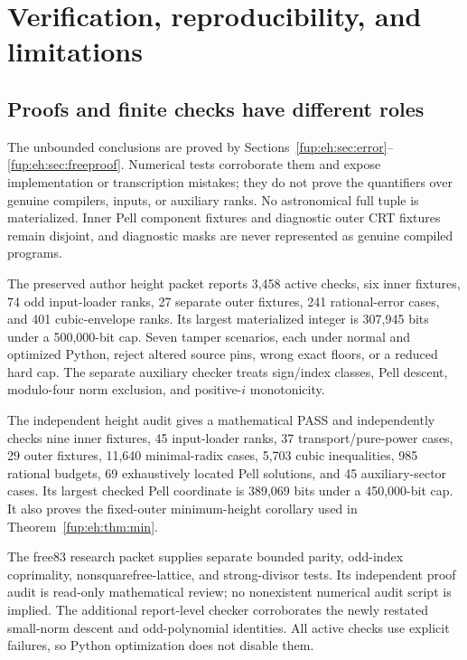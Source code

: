 \documentclass[11pt,letterpaper]{article}
\theoremstyle{definition}\newtheorem{definition}[theorem]{Definition}
\theoremstyle{remark}\newtheorem{remark}[theorem]{Remark}
\begin{document}
\section{Verification, reproducibility, and limitations}
\label{fup:eh:sec:verification}
\subsection{Proofs and finite checks have different roles}
The unbounded conclusions are proved by Sections~\ref{fup:eh:sec:error}--
\ref{fup:eh:sec:freeproof}. Numerical tests corroborate them and expose
implementation or transcription mistakes; they do not prove the
quantifiers over genuine compilers, inputs, or auxiliary ranks.
No astronomical full tuple is materialized. Inner Pell component
fixtures and diagnostic outer CRT fixtures remain disjoint, and
diagnostic masks are never represented as genuine compiled programs.

The preserved author height packet \cite{fup:eh:height} reports 3,458 active
checks, six inner fixtures, 74 odd input-loader ranks, 27 separate
outer fixtures, 241 rational-error cases, and 401 cubic-envelope ranks.
Its largest materialized integer is 307,945 bits under a 500,000-bit
cap. Seven tamper scenarios, each under normal and optimized Python,
reject altered source pins, wrong exact floors, or a reduced hard cap.
The separate auxiliary checker treats sign/index classes, Pell descent,
modulo-four norm exclusion, and positive-$i$ monotonicity.

The independent height audit \cite{fup:eh:heightaudit} gives a mathematical
PASS and independently checks nine inner fixtures, 45 input-loader
ranks, 37 transport/pure-power cases, 29 outer fixtures, 11,640
minimal-radix cases, 5,703 cubic inequalities, 985 rational budgets,
69 exhaustively located Pell solutions, and 45 auxiliary-sector cases.
Its largest checked Pell coordinate is 389,069 bits under a
450,000-bit cap. It also proves the fixed-outer minimum-height
corollary used in Theorem~\ref{fup:eh:thm:min}.

The free83 research packet \cite{fup:eh:freeproof} supplies separate bounded
parity, odd-index coprimality, nonsquarefree-lattice, and strong-divisor
tests. Its independent proof audit \cite{fup:eh:freeaudit} is read-only
mathematical review; no nonexistent numerical audit script is implied.
The additional report-level checker corroborates the newly restated
small-norm descent and odd-polynomial identities. All active checks
use explicit failures, so Python optimization does not disable them.
\end{document}
